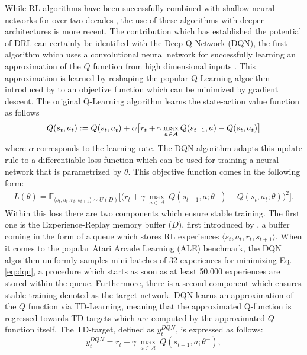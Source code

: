 While RL algorithms have been successfully combined with shallow neural networks for over two decades \cite{tesauro1994td}, the use of these algorithms with deeper architectures is more recent. 
The contribution which has established the potential of DRL can certainly be identified with the Deep-Q-Network (DQN), the first algorithm which uses a convolutional neural network for successfully learning an approximation of the $Q$ function from high dimensional inputs \cite{mnih2015human}. This approximation is learned by reshaping the popular Q-Learning algorithm introduced by \citet{watkins1992q} to an objective function which can be minimized by gradient descent. The original Q-Learning algorithm learns the state-action value function as follows
\begin{multline}
Q(s_{t}, a_{t}) := Q(s_{t}, a_{t}) + \alpha \big[r_{t} + \gamma \max_{a \in \cal A} Q(s_{t+1}, a) - Q(s_{t}, a_{t})\big]
\label{eq:q_learning}
\end{multline}
where $\alpha$ corresponds to the learning rate. The DQN algorithm adapts this update rule to a differentiable loss function which can be used for training a neural network that is parametrized by $\theta$. This objective function comes in the following form: 
\begin{multline}
L(\theta) = \mathds{E}_{\langle s_{t},a_{t},r_{t},s_{t+1}\rangle\sim U(D)} \bigg[\big(r_{t} + \gamma \: \underset{a\in \mathcal{A}}{\max}\: Q(s_{t+1}, a; \theta^{-}) - Q(s_{t}, a_{t}; \theta)\big)^{2}\bigg].
\label{eq:dqn}
\end{multline}
Within this loss there are two components which ensure stable training. The first one is the Experience-Replay memory buffer ($D$), first introduced by \citet{lin1992self}, a buffer coming in the form of a queue which stores RL experiences $\langle s_{t},a_{t},r_{t},s_{t+1}\rangle$. When it comes to the popular Atari Arcade Learning (ALE) \cite{bellemare2013arcade} benchmark, the DQN algorithm uniformly samples mini-batches of 32 experiences for minimizing Eq. \ref{eq:dqn}, a procedure which starts as soon as at least 50.000 experiences are stored within the queue.
Furthermore, there is a second component which ensures stable training denoted as the target-network. DQN learns an approximation of the $Q$ function via TD-Learning, meaning that the approximated Q-function is regressed towards TD-targets which are computed by the approximated $Q$ function itself. The TD-target, defined as $y^{DQN}_{t}$, is expressed as follows:
\begin{equation}
    y^{DQN}_{t} = r_{t} + \gamma \: \underset{a\in \mathcal{A}}{\max}\: Q(s_{t+1}, a; \theta^{-}), 
\label{eq:dqn_td}
\end{equation}{}
